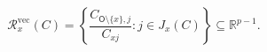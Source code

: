 \[
\mathcal R_x^{\mathrm{vec}}(C)
=\left\{\frac{C_{\mathsf O\setminus\{x\},j}}{C_{xj}}:j\in J_x(C)\right\}
\subseteq\mathbb R^{p-1}.
\]